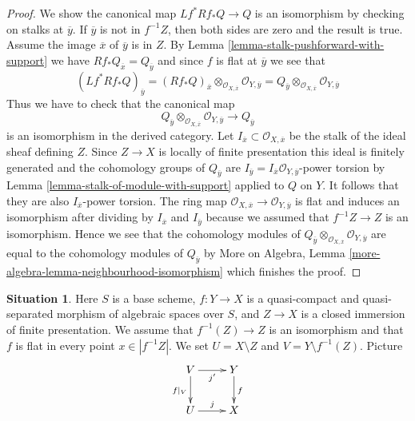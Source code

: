 \documentclass{stacks-project}
\theoremstyle{plain}
\theoremstyle{definition}
\newtheorem{situation}[subsection]{Situation}
\theoremstyle{remark}
\numberwithin{equation}{subsection}
\begin{document}
\begin{proof}
We show the canonical map $Lf^*Rf_*Q \to Q$ is an isomorphism
by checking on stalks at $\overline{y}$. If $\overline{y}$ is not
in $f^{-1}Z$, then both sides are zero and the result is true.
Assume the image $\overline{x}$ of $\overline{y}$ is in $Z$.
By Lemma \ref{lemma-stalk-pushforward-with-support} we have
$Rf_*Q_{\overline{x}} = Q_{\overline{y}}$ and since $f$ is flat
at $\overline{y}$ we see that
$$
(Lf^*Rf_*Q)_{\overline{y}} =
(Rf_*Q)_{\overline{x}}
\otimes_{\mathcal{O}_{X, \overline{x}}}
\mathcal{O}_{Y, \overline{y}} =
Q_{\overline{y}} \otimes_{\mathcal{O}_{X, \overline{x}}}
\mathcal{O}_{Y, \overline{y}}
$$
Thus we have to check that the canonical map
$$
Q_{\overline{y}} \otimes_{\mathcal{O}_{X, \overline{x}}}
\mathcal{O}_{Y, \overline{y}}
\longrightarrow Q_{\overline{y}}
$$
is an isomorphism in the derived category. Let
$I_{\overline{x}} \subset \mathcal{O}_{X, \overline{x}}$ be the
stalk of the ideal sheaf defining $Z$. Since $Z \to X$ is locally of
finite presentation this ideal is finitely generated and the
cohomology groups of $Q_{\overline{y}}$
are $I_{\overline{y}} = I_{\overline{x}}\mathcal{O}_{Y, \overline{y}}$-power
torsion by Lemma \ref{lemma-stalk-of-module-with-support} applied to $Q$ on $Y$.
It follows that they are also $I_{\overline{x}}$-power torsion.
The ring map
$\mathcal{O}_{X, \overline{x}} \to \mathcal{O}_{Y, \overline{y}}$
is flat and induces an isomorphism after dividing by
$I_{\overline{x}}$ and $I_{\overline{y}}$ because we assumed
that $f^{-1}Z \to Z$ is an isomorphism. Hence we see that
the cohomology modules of
$Q_{\overline{y}} \otimes_{\mathcal{O}_{X, \overline{x}}}
\mathcal{O}_{Y, \overline{y}}$
are equal to the cohomology modules of $Q_{\overline{y}}$ by
More on Algebra, Lemma \ref{more-algebra-lemma-neighbourhood-isomorphism}
which finishes the proof.
\end{proof}

\begin{situation}
\label{situation-formal-glueing}
Here $S$ is a base scheme, $f : Y \to X$ is a quasi-compact
and quasi-separated morphism of algebraic spaces over $S$, and
$Z \to X$ is a closed immersion of finite presentation. We assume that
$f^{-1}(Z) \to Z$ is an isomorphism and that $f$ is flat in every
point $x \in |f^{-1}Z|$. We set $U = X \setminus Z$ and
$V = Y \setminus f^{-1}(Z)$.
Picture
$$
\xymatrix{
V \ar[r]_{j'} \ar[d]_{f|_V} & Y \ar[d]^f \\
U \ar[r]^j & X
}
$$
\end{situation}
\end{document}
